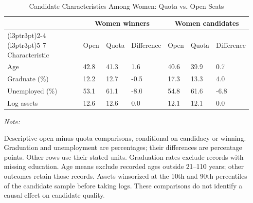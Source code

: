 \begin{table}[!h]
\centering
\caption{\label{tab:candidate_women}Candidate Characteristics Among Women: Quota vs. Open Seats}
\centering
\fontsize{8}{10}\selectfont
\begin{threeparttable}
\begin{tabular}[t]{lllllll}
\toprule
\multicolumn{1}{c}{ } & \multicolumn{3}{c}{Women winners} & \multicolumn{3}{c}{Women candidates} \\
\cmidrule(l{3pt}r{3pt}){2-4} \cmidrule(l{3pt}r{3pt}){5-7}
Characteristic & Open & Quota & Difference & Open & Quota & Difference\\
\midrule
Age & 42.8 & 41.3 & 1.6 & 40.6 & 39.9 & 0.7\\
Graduate (\%) & 12.2 & 12.7 & -0.5 & 17.3 & 13.3 & 4.0\\
Unemployed (\%) & 53.1 & 61.1 & -8.0 & 54.8 & 61.6 & -6.8\\
Log assets & 12.6 & 12.6 & 0.0 & 12.1 & 12.1 & 0.0\\
\bottomrule
\end{tabular}
\begin{tablenotes}
\item \textit{Note: } 
\item Descriptive open-minus-quota comparisons, conditional on candidacy or winning. Graduation and unemployment are percentages; their differences are percentage points. Other rows use their stated units. Graduation rates exclude records with missing education. Age means exclude recorded ages outside 21--110 years; other outcomes retain those records. Assets winsorized at the 10th and 90th percentiles of the candidate sample before taking logs. These comparisons do not identify a causal effect on candidate quality.
\end{tablenotes}
\end{threeparttable}
\end{table}
